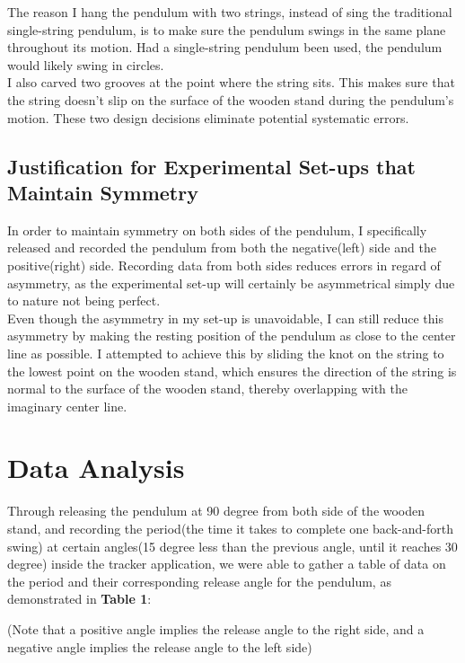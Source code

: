\documentclass{article}
\begin{document}
The reason I hang the pendulum with two strings, instead of sing the traditional single-string pendulum, is to make sure the pendulum swings in the same plane throughout its motion. Had a single-string pendulum been used, the pendulum would likely swing in circles.\\

\noindent I also carved two grooves at the point where the string sits. This makes sure that the string doesn't slip on the surface of the wooden stand during the pendulum's motion. These two design decisions eliminate potential systematic errors.

\subsection{Justification for Experimental Set-ups that Maintain Symmetry}

In order to maintain symmetry on both sides of the pendulum, I specifically released and recorded the pendulum from both the negative(left) side and the positive(right) side. Recording data from both sides reduces errors in regard of asymmetry, as the experimental set-up will certainly be asymmetrical simply due to nature not being perfect.\\

\noindent Even though the asymmetry in my set-up is unavoidable, I can still reduce this asymmetry by making the resting position of the pendulum as close to the center line as possible. I attempted to achieve this by sliding the knot on the string to the lowest point on the wooden stand, which ensures the direction of the string is normal to the surface of the wooden stand, thereby overlapping with the imaginary center line.

\section{Data Analysis}

Through releasing the pendulum at 90 degree from both side of the wooden stand, and recording the period(the time it takes to complete one back-and-forth swing) at certain angles(15 degree less than the previous angle, until it reaches 30 degree) inside the tracker application, we were able to gather a table of data on the period and their corresponding release angle for the pendulum, as demonstrated in \textbf{Table 1}: \\

\begin{center}(Note that a positive angle implies the release angle to the right side, and a negative angle implies the release angle to the left side)
\end{center}
\end{document}
